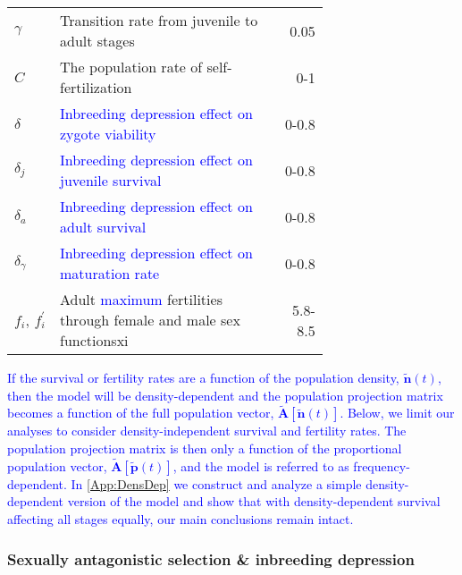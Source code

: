 \documentclass[11pt]{article}
\def\mbf#1{\mathbf{#1}}
\begin{document}
\begin{table}[htbp]
\begin{tabular}{ l p{0.7\linewidth} r }
$\gamma$ & Transition rate from juvenile to adult stages & 0.05\\
$C$ & The population rate of self-fertilization &0-1 \\
$\delta$ &\textcolor{blue}{ Inbreeding depression effect on zygote viability}&0-0.8\\
$ \delta_j$ & \textcolor{blue}{ Inbreeding depression effect on juvenile survival}& 0-0.8\\
$\delta_a$ & \textcolor{blue}{ Inbreeding depression effect on adult survival}& 0-0.8\\
$\delta_{\gamma}$ &\textcolor{blue}{Inbreeding depression effect on maturation rate} & 0-0.8\\
$f_i,\,f^{\prime}_i$ & Adult \textcolor{blue}{maximum} fertilities through female and male sex functionsxi & 5.8-8.5 \\

\hline
\end{tabular}
\end{table}
\newpage{}

\textcolor{blue}{If the survival or fertility rates are a function of the population density, $\tilde{\mbf{n}}(t)$, then the model will be density-dependent and the population projection matrix becomes a function of the full population vector, $\tilde{\mbf{A}}[\tilde{\mbf{n}}(t)]$. Below, we limit our analyses to consider density-independent survival and fertility rates. The population projection matrix is then only a function of the proportional population vector, $\tilde{\mbf{A}}[\tilde{\mbf{p}}(t)]$, and the model is referred to as frequency-dependent. In \ref{App:DensDep} we construct and analyze a simple density-dependent version of the model and show that with density-dependent survival affecting all stages equally, our main conclusions remain intact.}




\subsubsection*{Sexually antagonistic selection \& inbreeding depression} \label{sec:SAsel}
\end{document}
